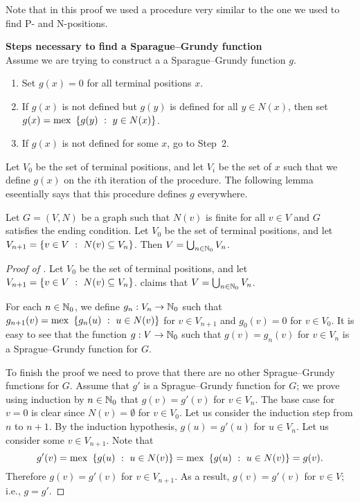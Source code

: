 Note that in this proof we used a procedure very similar to the one we used to
find P- and N-positions.
\begin{template}
  \textbf{Steps necessary to find a Sparague--Grundy function} \\

  Assume we are trying to construct a a Sparague--Grundy function $g$.
  \begin{enumerate}
    \item Set $g(x) = 0$ for all terminal positions $x$.
    \item If $g(x)$ is not defined but $g(y)$ is defined for all $y \in N(x)$,
      then set $g(x) = \mex \set[y \in N(x)]{g(y)}$.
    \item If $g(x)$ is not defined for some $x$, go to Step~2.
  \end{enumerate}
\end{template}

Let $V_0$ be the set of terminal positions, and let $V_i$ be the set of $x$ such
that we define $g(x)$ on the $i$th iteration of the procedure.
The following lemma eseentially says that this procedure defines $g$ everywhere.
\begin{lemma}[K\H{o}nig]
\label{lemma:konig}
  Let $G = (V, N)$ be a graph such that $N(v)$ is finite for all $v \in V$ and
  $G$ satisfies the ending condition.
  Let $V_0$ be the set of terminal positions, and let $V_{n + 1} = 
  \set[N(v) \subseteq V_n]{v \in V}$. Then $V = \bigcup_{n \in {\mathbb{N}}_0} V_n$.
\end{lemma}

\begin{proof}[Proof of ]
  Let $V_0$ be the set of terminal positions, and let $V_{n + 1} = 
  \set[N(v) \subseteq V_n]{v \in V}$.
   claims that $V = \bigcup_{n \in {\mathbb{N}}_0} V_n$.

  For each $n \in {\mathbb{N}}_0$, we define $g_n : V_n \to {\mathbb{N}}_0$ such that 
  $
    g_{n + 1}(v) = \mex \set[u \in N(v)]{g_n(u)}
  $
  for $v \in V_{n + 1}$ and $g_0(v) = 0$ for $v \in V_0$. It is easy to see
  that the function $g : V \to {\mathbb{N}}_0$ such that $g(v) = g_n(v)$ for $v \in V_n$
  is a Sprague--Grundy function for $G$. 

  To finish the proof we need to prove that there are no other Sprague--Grundy
  functions for $G$. Assume that $g'$ is a Sprague--Grundy function for
  $G$; we prove using induction by $n \in {\mathbb{N}}_0$ that $g(v) = g'(v)$ for 
  $v \in V_n$. The base case for $v = 0$ is clear since $N(v) = \emptyset$ for
  $v \in V_0$. Let us consider the induction step from $n$ to $n + 1$. By the
  induction hypothesis, $g(u) = g'(u)$ for $u \in V_n$. Let us consider some $v
  \in V_{n + 1}$. Note that 
  \[
    g'(v) = \mex \set[u \in N(v)]{g(u)} = \mex \set[u \in N(v)]{g(u)} = g(v).
  \]
  Therefore $g(v) = g'(v)$ for $v \in V_{n + 1}$. As a result, $g(v) = g'(v)$
  for $v \in V$; i.e., $g = g'$.
\end{proof}

